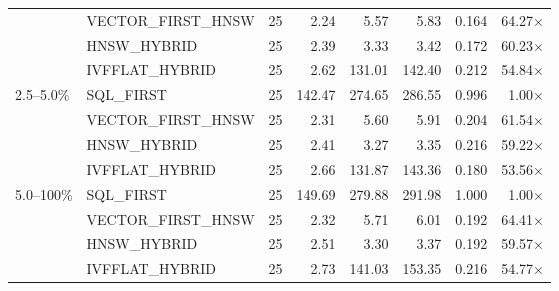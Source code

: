 \begin{table}[t]
\begin{tabular}{l l r r r r r r}
             & VECTOR\_FIRST\_HNSW & 25 &   2.24 &   5.57 &   5.83 & 0.164 & 64.27$\times$ \\
             & HNSW\_HYBRID        & 25 &   2.39 &   3.33 &   3.42 & 0.172 & 60.23$\times$ \\
             & IVFFLAT\_HYBRID     & 25 &   2.62 & 131.01 & 142.40 & 0.212 & 54.84$\times$ \\
2.5--5.0\%   & SQL\_FIRST         & 25 & 142.47 & 274.65 & 286.55 & 0.996 & 1.00$\times$ \\
             & VECTOR\_FIRST\_HNSW & 25 &   2.31 &   5.60 &   5.91 & 0.204 & 61.54$\times$ \\
             & HNSW\_HYBRID        & 25 &   2.41 &   3.27 &   3.35 & 0.216 & 59.22$\times$ \\
             & IVFFLAT\_HYBRID     & 25 &   2.66 & 131.87 & 143.36 & 0.180 & 53.56$\times$ \\
5.0--100\%   & SQL\_FIRST         & 25 & 149.69 & 279.88 & 291.98 & 1.000 & 1.00$\times$ \\
             & VECTOR\_FIRST\_HNSW & 25 &   2.32 &   5.71 &   6.01 & 0.192 & 64.41$\times$ \\
             & HNSW\_HYBRID        & 25 &   2.51 &   3.30 &   3.37 & 0.192 & 59.57$\times$ \\
             & IVFFLAT\_HYBRID     & 25 &   2.73 & 141.03 & 153.35 & 0.216 & 54.77$\times$ \\
\hline
\end{tabular}
\end{table}
